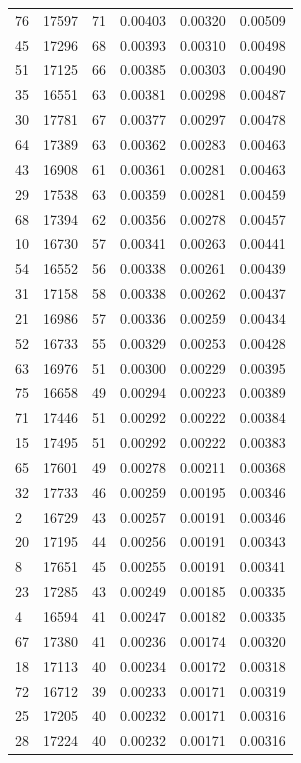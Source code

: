 \begin{tabular}{lrrrrr}
76 & 17597 & 71 & 0.00403 & 0.00320 & 0.00509 \\
45 & 17296 & 68 & 0.00393 & 0.00310 & 0.00498 \\
51 & 17125 & 66 & 0.00385 & 0.00303 & 0.00490 \\
35 & 16551 & 63 & 0.00381 & 0.00298 & 0.00487 \\
30 & 17781 & 67 & 0.00377 & 0.00297 & 0.00478 \\
64 & 17389 & 63 & 0.00362 & 0.00283 & 0.00463 \\
43 & 16908 & 61 & 0.00361 & 0.00281 & 0.00463 \\
29 & 17538 & 63 & 0.00359 & 0.00281 & 0.00459 \\
68 & 17394 & 62 & 0.00356 & 0.00278 & 0.00457 \\
10 & 16730 & 57 & 0.00341 & 0.00263 & 0.00441 \\
54 & 16552 & 56 & 0.00338 & 0.00261 & 0.00439 \\
31 & 17158 & 58 & 0.00338 & 0.00262 & 0.00437 \\
21 & 16986 & 57 & 0.00336 & 0.00259 & 0.00434 \\
52 & 16733 & 55 & 0.00329 & 0.00253 & 0.00428 \\
63 & 16976 & 51 & 0.00300 & 0.00229 & 0.00395 \\
75 & 16658 & 49 & 0.00294 & 0.00223 & 0.00389 \\
71 & 17446 & 51 & 0.00292 & 0.00222 & 0.00384 \\
15 & 17495 & 51 & 0.00292 & 0.00222 & 0.00383 \\
65 & 17601 & 49 & 0.00278 & 0.00211 & 0.00368 \\
32 & 17733 & 46 & 0.00259 & 0.00195 & 0.00346 \\
2 & 16729 & 43 & 0.00257 & 0.00191 & 0.00346 \\
20 & 17195 & 44 & 0.00256 & 0.00191 & 0.00343 \\
8 & 17651 & 45 & 0.00255 & 0.00191 & 0.00341 \\
23 & 17285 & 43 & 0.00249 & 0.00185 & 0.00335 \\
4 & 16594 & 41 & 0.00247 & 0.00182 & 0.00335 \\
67 & 17380 & 41 & 0.00236 & 0.00174 & 0.00320 \\
18 & 17113 & 40 & 0.00234 & 0.00172 & 0.00318 \\
72 & 16712 & 39 & 0.00233 & 0.00171 & 0.00319 \\
25 & 17205 & 40 & 0.00232 & 0.00171 & 0.00316 \\
28 & 17224 & 40 & 0.00232 & 0.00171 & 0.00316 \\

\end{tabular}
